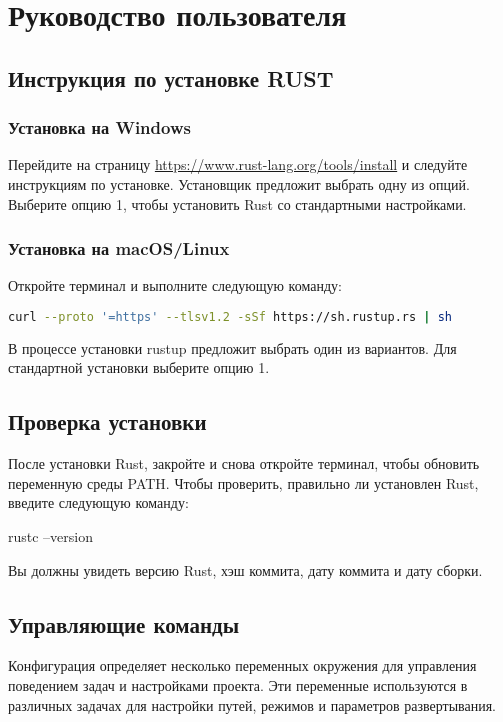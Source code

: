 \section{Руководство пользователя}

\subsection{Инструкция по установке RUST}
\subsubsection{Установка на Windows}
	Перейдите на страницу \url{https://www.rust-lang.org/tools/install} и следуйте инструкциям по установке.
    Установщик предложит выбрать одну из опций. Выберите опцию 1, чтобы установить Rust со стандартными настройками.

\subsubsection{Установка на macOS/Linux}
Откройте терминал и выполните следующую команду:

\begin{lstlisting}[language=bash]
curl --proto '=https' --tlsv1.2 -sSf https://sh.rustup.rs | sh
\end{lstlisting}


В процессе установки rustup предложит выбрать один из вариантов. Для стандартной установки выберите опцию 1.

\subsection{Проверка установки}
	После установки Rust, закройте и снова откройте терминал, чтобы обновить переменную среды PATH.
	Чтобы проверить, правильно ли установлен Rust, введите следующую команду:
\begin{lstinline}[language=bash]
rustc --version
\end{lstinline}


Вы должны увидеть версию Rust, хэш коммита, дату коммита и дату сборки.

\subsection{Управляющие команды}

Конфигурация определяет несколько переменных окружения для управления поведением задач и настройками проекта. Эти переменные используются в различных задачах для настройки путей, режимов и параметров развертывания.

